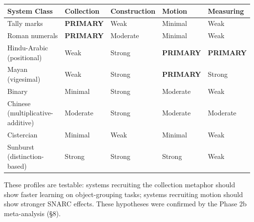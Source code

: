 \documentclass[
]{article}
\newcounter{none} %
\begin{document}
{\def\LTcaptype{none} %
\begin{longtable}[]{@{}
  >{\raggedright\arraybackslash}p{}
  >{\centering\arraybackslash}p{}
  >{\centering\arraybackslash}p{}
  >{\centering\arraybackslash}p{}
  >{\centering\arraybackslash}p{}@{}}
\toprule\noalign{}
\begin{minipage}[b]{\linewidth}\raggedright
System Class
\end{minipage} & \begin{minipage}[b]{\linewidth}\centering
Collection
\end{minipage} & \begin{minipage}[b]{\linewidth}\centering
Construction
\end{minipage} & \begin{minipage}[b]{\linewidth}\centering
Motion
\end{minipage} & \begin{minipage}[b]{\linewidth}\centering
Measuring
\end{minipage} \\
\midrule\noalign{}
\endhead
\bottomrule\noalign{}
\endlastfoot
Tally marks & \textbf{PRIMARY} & Weak & Minimal & Weak \\
Roman numerals & \textbf{PRIMARY} & Moderate & Minimal & Weak \\
Hindu-Arabic (positional) & Weak & Strong & \textbf{PRIMARY} &
\textbf{PRIMARY} \\
Mayan (vigesimal) & Weak & Strong & \textbf{PRIMARY} & Strong \\
Binary & Minimal & Strong & Moderate & Weak \\
Chinese (multiplicative-additive) & Moderate & Strong & Moderate &
Moderate \\
Cistercian & Minimal & Weak & Minimal & Weak \\
Sunburst (distinction-based) & Strong & Strong & Strong & Weak \\
\end{longtable}
}

These profiles are testable: systems recruiting the collection metaphor
should show faster learning on object-grouping tasks; systems recruiting
motion should show stronger SNARC effects. These hypotheses were
confirmed by the Phase 2b meta-analysis (§8).
\end{document}
